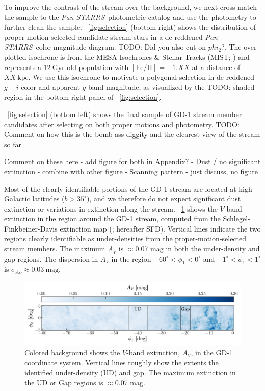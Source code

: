 \documentclass[modern]{aastex62}
\newcommand{\pans}{\textsl{Pan-STARRS}}
\newcommand{\kpc}{\textrm{kpc}}
\newcommand{\feh}{\ensuremath{[\textrm{Fe} / \textrm{H}]}}
\newcommand{\todo}[1]{{\color{red} TODO: #1}}
\begin{document}
To improve the contrast of the stream over the background, we next cross-match
the sample to the \pans\ photometric catalog and use the photometry to further
clean the sample.
\figurename~\ref{fig:selection} (bottom right) shows the distribution of
proper-motion-selected candidate stream stars in a de-reddened \pans\
color-magnitude diagram.
\todo{Did you also cut on $phi_2$?}.
The over-plotted isochrone is from the MESA Isochrones & Stellar Tracks (MIST;
\citealt{XX}) and represents a $12~\textrm{Gyr}$ old population with $\feh =
-1.XX$ at a distance of $XX~\kpc$.
We use this isochrone to motivate a polygonal selection in de-reddened $g-i$
color and apparent $g$-band magnitude, as visualized by the \todo{shaded} region
in the bottom right panel of \figurename~\ref{fig:selection}.

\figurename~\ref{fig:selection} (bottom left) shows the final sample of GD-1
stream member candidates after selecting on both proper motions and photometry.
\todo{Comment on how this is the bomb ass diggity and the clearest view of the
stream so far}


Comment on these here - add figure for both in Appendix?
- Dust / no significant extinction - combine with other figure
- Scanning pattern - just discuss, no figure

Most of the clearly identifiable portions of the GD-1 stream are located at high
Galactic latitudes ($b > 35^\circ$), and we therefore do not expect significant
dust extinction or variations in extinction along the stream.
\figurename~\ref{fig:sfd} shows the $V$-band extinction in the region around the
GD-1 stream, computed from the Schlegel-Finkbeiner-Davis extinction map
(\cite{Schlegel:1998}; hereafter SFD).
Vertical lines indicate the two regions clearly identifiable as under-densities
from the proper-motion-selected stream members.
The maximum $A_V$ is $\approx$0.07 mag in both the under-density and gap
regions.
The dispersion in $A_V$ in the region $-60^\circ < \phi_1 < 0^\circ$ and
$-1^\circ < \phi_1 < 1^\circ$ is $\sigma_{A_V} \approx 0.03~\textrm{mag}$.

\begin{figure}[h]
\begin{center}
\includegraphics[width=\textwidth]{sfd.pdf}
\end{center}
\caption{%
Colored background shows the $V$-band extinction, $A_V$, in the GD-1
coordinate system.
Vertical lines roughly show the extents the identified under-density (UD) and
gap.
The maximum extinction in the UD or Gap regions is $\approx$0.07 mag.
\label{fig:sfd}
}
\end{figure}
\end{document}
